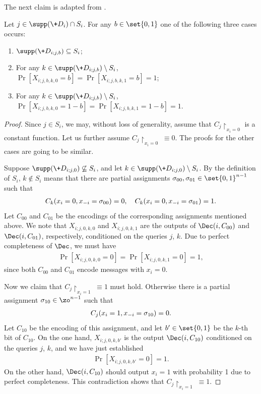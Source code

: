 The next claim is adapted from .
\begin{claim} \label{clm:adaptive-fixable-or-useless}
Let $j \in \supp(\+D_i)\cap S_i$. For any $b \in \set{0,1}$ one of the following three cases occurs:
\begin{enumerate}
\item $\supp(\+D_{i;j,b}) \subseteq S_i$; 
\item For any $k \in \supp(\+D_{i;j,b}) \setminus S_i$, $\Pr[X_{i;j,b,k,0} = b] = \Pr[X_{i;j,b,k,1} = b] = 1$; 
\item For any $k \in \supp(\+D_{i;j,b}) \setminus S_i$, $\Pr[X_{i;j,b,k,0} = 1-b] = \Pr[X_{i;j,b,k,1} = 1-b] = 1$.
\end{enumerate}
\end{claim}
\begin{proof}
Since $j \in S_i$, we may, without loss of generality, assume that $C_j \restriction_{x_i=0}$ is a constant function. Let us further assume $C_j \restriction_{x_i=0} \;\equiv 0$. The proofs for the other cases are going to be similar.

Suppose $\supp(\+D_{i;j,0}) \not\subseteq S_i$, and let $k \in \supp(\+D_{i;j,0}) \setminus S_i$. By the definition of $S_i$, $k \notin S_i$ means that there are partial assignments $\sigma_{00}, \sigma_{01} \in \set{0,1}^{n-1}$ such that
\begin{align*}
C_k(x_i=0, \*x_{-i}=\sigma_{00}) = 0, \quad C_k(x_i=0, \*x_{-i}=\sigma_{01}) = 1.
\end{align*}
Let $C_{00}$ and $C_{01}$ be the encodings of the corresponding assignments mentioned above. We note that $X_{i;j,0,k,0}$ and $X_{i;j,0,k,1}$ are the outputs of $\Dec(i,C_{00})$ and $\Dec(i,C_{01})$, respectively, conditioned on the queries $j$, $k$. Due to perfect completeness of $\Dec$, we must have 
\begin{align*}
	\Pr[X_{i;j,0,k,0} = 0] = \Pr[X_{i;j,0,k,1} = 0] = 1,
\end{align*}
since both $C_{00}$ and $C_{01}$ encode messages with $x_i = 0$.

Now we claim that $C_j\restriction_{x_i=1} \;\equiv 1$ must hold. Otherwise there is a partial assignment $\sigma_{10} \in \zo^{n-1}$ such that
\begin{align*}
C_j(x_i=1, \*x_{-i}=\sigma_{10}) = 0.
\end{align*}
Let $C_{10}$ be the encoding of this assignment, and let $b' \in \set{0,1}$ be the $k$-th bit of $C_{10}$. On the one hand, $X_{i;j,0,k,b'}$ is the output $\Dec(i,C_{10})$ conditioned on the queries $j$, $k$, and we have just established
\begin{align*}
	\Pr[X_{i;j,0,k,b'} = 0] = 1.
\end{align*} 
On the other hand, $\Dec(i,C_{10})$ should output $x_i=1$ with probability 1 due to perfect completeness. This contradiction shows that $C_j\restriction_{x_i=1} \;\equiv 1$. 


\end{proof}
